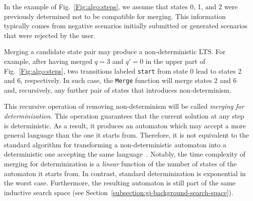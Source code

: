 \begin{description}
In the example of Fig.~\ref{Fig:algo:steps}, we assume that states 0, 1, and 2 were previously determined not to be compatible for merging. This information typically comes from negative scenarios initially submitted or generated scenarios that were rejected by the user. 

Merging a candidate state pair may produce a non-deterministic LTS. For example, after having merged $q = 3$ and $q' = 0$ in the upper part of Fig.~\ref{Fig:algo:steps}, two transitions labeled \texttt{start} from state 0 lead to states 2 and 6, respectively. In such case, the \texttt{Merge} function will merge states 2 and 6 and, recursively, any further pair of states that introduces non-determinism. 

This recursive operation of removing non-determinism will be called \textsl{merging for determinization}. This operation guarantees that the current solution at any step is deterministic. As a result, it produces an automaton which may accept a more general language than the one it starts from. Therefore, it is not equivalent to the standard algorithm for transforming a non-deterministic automaton into a deterministic one accepting the same language~\cite{Hopcroft:1979}. Notably, the time complexity of merging for determinization is a \emph{linear} function of the number of states of the automaton it starts from. In contrast, standard determinization is exponential in the worst case. Furthermore, the resulting automaton is still part of the same inductive search space (see Section~\ref{subsection:gi-background-search-space}). 


\end{description}

